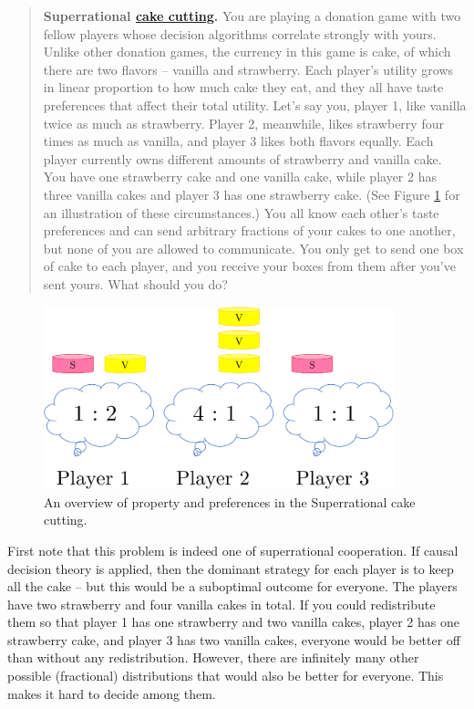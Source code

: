 \begin{quote}
\textbf{Superrational
\href{https://en.wikipedia.org/wiki/Fair_cake-cutting}{cake
cutting}.} You are playing a donation game with two fellow players
whose decision algorithms correlate strongly with yours. Unlike other
donation games, the currency in this game is cake, of which there are
two flavors -- vanilla and strawberry. Each player's utility grows in
linear proportion to how much cake they eat, and they all have taste
preferences that affect their total utility. Let's say you, player 1,
like vanilla twice as much as strawberry. Player 2, meanwhile, likes
strawberry four times as much as vanilla, and player 3 likes both
flavors equally. Each player currently owns different amounts of
strawberry and vanilla cake. You have one strawberry cake and one
vanilla cake, while player 2 has three vanilla cakes and player 3 has
one strawberry cake. (See Figure
\ref{Superrational-cake-cutting} for an illustration of
these circumstances.) You all know each other's taste preferences and
can send arbitrary fractions of your cakes to one another, but none of
you are allowed to communicate. You only get to send one box of cake to
each player, and you receive your boxes from them after you've sent
yours. What should you do?
\end{quote}

\begin{figure}
    \centering
    \includegraphics[width=4in]{figs/Superrational-cake-cutting}
    \caption{An overview of property and preferences in the Superrational cake cutting.}
    \label{Superrational-cake-cutting}
\end{figure}

First note that this problem is indeed one of superrational cooperation.
If causal decision theory is applied, then the dominant strategy for
each player is to keep all the cake -- but this would be a suboptimal
outcome for everyone. The players have two strawberry and four vanilla
cakes in total. If you could redistribute them so that player 1 has one
strawberry and two vanilla cakes, player 2 has one strawberry cake, and
player 3 has two vanilla cakes, everyone would be better off than
without any redistribution. However, there are infinitely many
other possible (fractional) distributions that would also be better for
everyone. This makes it hard to decide among them.

